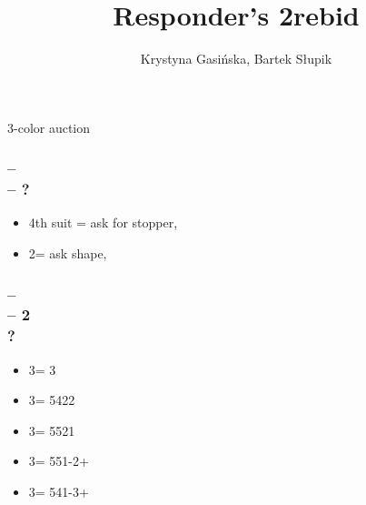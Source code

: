 \documentclass[12pt, a4paper]{article}
\title{Responder's 2\nt rebid}
\author{Krystyna Gasińska, Bartek Słupik}
\begin{document}
\maketitle

3-color auction

\subsubsection*{ --  \\  -- ?}
\begin{itemize}
    \item 4th suit = ask for stopper, \gf
    \item 2\nt = ask shape, \gf
\end{itemize}

\subsubsection*{ --  \\  -- 2\nt \\ ?}
\begin{itemize}
    \item 3\clubs = 3
    \item 3\diams = 5422
    \item 3\hearts = 5521
    \item 3\spades = 551-2+
    \item 3\nt = 541-3+
\end{itemize}

\end{document}
